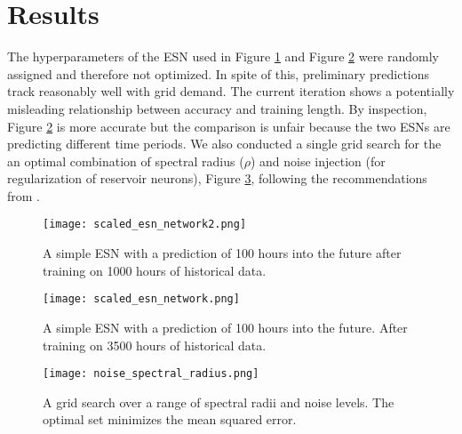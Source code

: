 \section{Results}

The hyperparameters of the \acrshort{ESN} used in Figure \ref{fig:ESN1} and
Figure \ref{fig:ESN2} were randomly assigned and therefore not optimized. In
spite of this, preliminary predictions track reasonably well with grid demand.
The current iteration shows a potentially
misleading relationship between accuracy and training length. By inspection,
Figure \ref{fig:ESN2} is more accurate but the comparison is unfair because
the two ESNs are predicting different time periods.
We also conducted a single grid search for the an optimal combination of
spectral radius ($\rho$) and noise injection (for regularization of reservoir
neurons), Figure \ref{fig:gridsearch}, following the recommendations from
\cite{lukosevicius_practical_2012}.

\begin{figure}[h]
  \centering
  \texttt{[image: scaled\_esn\_network2.png]}
  \caption{A simple ESN with a prediction of 100 hours into the future after
  training on 1000 hours of historical data.}
  \label{fig:ESN1}
\end{figure}
\begin{figure}[h]
  \centering
  \texttt{[image: scaled\_esn\_network.png]}
  \caption{A simple ESN with a prediction of 100 hours into the future. After
  training on 3500 hours of historical data.}
  \label{fig:ESN2}
\end{figure}
\begin{figure}[h]
  \centering
  \texttt{[image: noise\_spectral\_radius.png]}
  \caption{A grid search over a range of spectral radii and noise levels. The
  optimal set minimizes the mean squared error.}
  \label{fig:gridsearch}
\end{figure}
